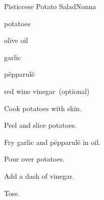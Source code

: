 \begin{recipe}{Pisticcese Potato Salad}{Nonna}{}

\begin{ingredients}
\item potatoes
\item olive oil
\item garlic
\item p\"epparul\"e
\item red wine vinegar~(optional)
\end{ingredients}

\begin{directions}
\item Cook potatoes with skin.
\item Peel and slice potatoes.
\item Fry garlic and p\"epparul\"e in oil.
\item Pour over potatoes.
\item Add a dash of vinegar.
\item Toss.
\end{directions}

\end{recipe}
